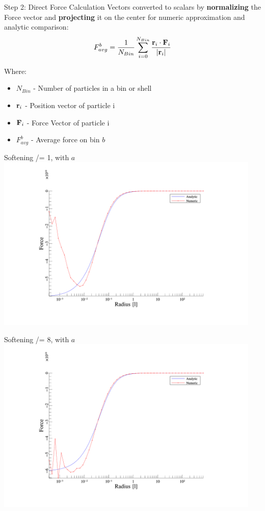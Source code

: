 \begin{frame}{Step 2: Direct Force Calculation}
	Vectors converted to scalars by \textbf{normalizing} the Force vector and \textbf{projecting} it on the center
	for numeric approximation and analytic comparison:
	\begin{equation}
		F_{avg}^b = \frac{1}{N_{Bin}} \sum^{N_{Bin}}_{i=0} \frac{\vb{r}_i\cdot \vb{F}_i}{|\vb{r}_i|}
	\end{equation}

	{\footnotesize Where:
	\begin{itemize}
		\item $N_{Bin}$ - Number of particles in a bin or shell
		\item $\vb{r}_i$ - Position vector of particle i
		\item $\vb{F}_i$ - Force Vector of particle i
		\item $F_{avg}^b$ - Average force on bin $b$
	\end{itemize}
	}
\end{frame}

\begin{frame}{Softening /= 1, with $a$}
	\includegraphics[width=0.95\textwidth]{figures/plots/forces_a_1.png}
\end{frame}

\begin{frame}{Softening /= 8, with $a$}
	\includegraphics[width=0.95\textwidth]{figures/plots/forces_a_8.png}
\end{frame}

